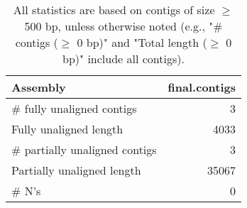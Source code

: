 \documentclass[12pt,a4paper]{article}
\begin{document}
\begin{table}[ht]
\begin{center}
\caption{All statistics are based on contigs of size $\geq$ 500 bp, unless otherwise noted (e.g., "\# contigs ($\geq$ 0 bp)" and "Total length ($\geq$ 0 bp)" include all contigs).}
\begin{tabular}{|l*{1}{|r}|}
\hline
Assembly & final.contigs \\ \hline
\# fully unaligned contigs & 3 \\ \hline
Fully unaligned length & 4033 \\ \hline
\# partially unaligned contigs & 3 \\ \hline
Partially unaligned length & 35067 \\ \hline
\# N's & 0 \\ \hline
\end{tabular}
\end{center}
\end{table}
\end{document}
